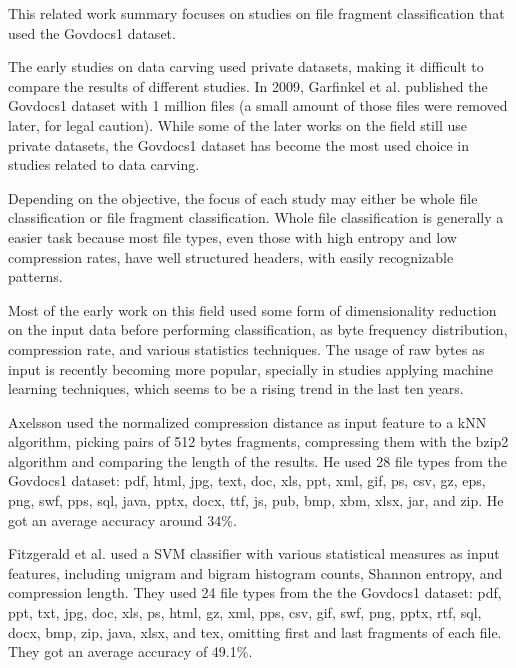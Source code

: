 This related work summary focuses on studies on file fragment classification that used the Govdocs1 dataset\cite{garfinkel_bringing_2009}.

The early studies on data carving used private datasets, making it difficult to compare the results of different studies. In 2009, Garfinkel et al. \cite{garfinkel_bringing_2009} published the Govdocs1 dataset with 1 million files (a small amount of those files were removed later, for legal caution). While some of the later works on the field still use private datasets, the Govdocs1 dataset has become the most used choice in studies related to data carving.

Depending on the objective, the focus of each study may either be whole file classification or file fragment classification. Whole file classification is generally a easier task because most file types, even those with high entropy and low compression rates, have well structured headers, with easily recognizable patterns.

Most of the early work on this field used some form of dimensionality reduction on the input data before performing classification, as byte frequency distribution, compression rate, and various statistics techniques. The usage of raw bytes as input is recently becoming more popular, specially in studies applying machine learning techniques, which seems to be a rising trend in the last ten years.


Axelsson \cite{axelsson_normalised_2010}
used the normalized compression distance as input feature to a kNN algorithm,
picking pairs of 512 bytes fragments, compressing them with the bzip2 algorithm
and comparing the length of the results. He used 28 file types from the Govdocs1 dataset: pdf, html, jpg, text, doc, xls,
ppt, xml, gif, ps, csv, gz, eps, png, swf, pps, sql, java, pptx, docx, ttf,
js, pub, bmp, xbm, xlsx, jar, and zip.
He got an average accuracy around 34\%.


Fitzgerald et al. \cite{fitzgerald_using_2012}  
used a SVM classifier with various statistical measures as input features, including unigram and bigram histogram counts, Shannon entropy, and compression length.
They used 24 file types from the the Govdocs1 dataset: pdf, ppt, txt, jpg, doc, xls, ps, html, gz, xml, pps, csv, gif, swf, png, pptx, rtf, sql, docx, bmp, zip, java, xlsx, and tex, omitting first and last fragments of each file.
They got an average accuracy of 49.1\%.

